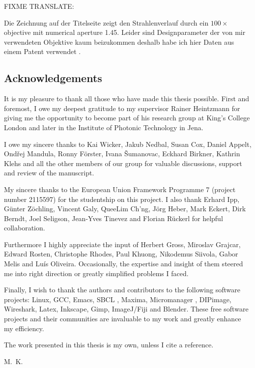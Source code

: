 \documentclass[oneside,a4paper,12pt,BCOR20mm,DIV14]{scrbook} %
\begin{document}
FIXME TRANSLATE:

Die Zeichnung auf der Titelseite zeigt den Strahlenverlauf durch ein
$100\times$ objective mit numerical aperture 1.45. Leider sind
Designparameter der von mir verwendeten Objektive kaum beizukommen
deshalb habe ich hier Daten aus einem Patent verwendet
\citep{Matthae2003}.


\subsection*{Acknowledgements}
It is my pleasure to thank all those who have made this thesis
possible. First and foremost, I owe my deepest gratitude to my
supervisor Rainer Heintzmann for giving me the opportunity to become
part of his research group at King's College London and later in the
Institute of Photonic Technology in Jena.

I owe my sincere thanks to Kai Wicker, Jakub Nedbal, Susan Cox, Daniel
Appelt, Ond\v rej Mandula, Ronny F\"orster, Ivana \v Sumanovac,
Eckhard Birkner, Kathrin Klehs and all the other members of our group
for valuable discussions, support and review of the manuscript.

My sincere thanks to the European Union Framework Programme 7 (project
number 2115597) for the studentship on this project.  I also thank
Erhard Ipp, G\"unter Z\"ochling, Vincent Galy, QueeLim Ch'ng, J\"org
Heber, Mark Eckert, Dirk Berndt, Joel Seligson, Jean-Yves Tinevez and
Florian R\"uckerl for helpful collaboration.

Furthermore I highly appreciate the input of Herbert Gross, Miroslav
Grajcar, Edward Rosten, Christophe Rhodes, Paul Khuong, Nikodemus
Siivola, Gabor Melis and Lu\' is Oliveira. Occasionally, the expertise
and insight of them steered me into right direction or greatly
simplified problems I faced.

Finally, I wish to thank the authors and contributors to the following
software projects: Linux, GCC, Emacs, SBCL \citep{Rhodes2008}, Maxima,
Micromanager \citep{Edelstein2010}, DIPimage, Wireshark, Latex,
Inkscape, Gimp, ImageJ/Fiji \citep{Abramoff,Schindelin2012} and
Blender.  These free software projects and their communities are
invaluable to my work and greatly enhance my efficiency.

The work presented in this thesis is my own, unless I cite a
reference.

\begin{flushright}
  M.~K.
\end{flushright}
\end{document}
